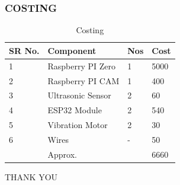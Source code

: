 \documentclass[
	11pt, %
	aspectratio=169, %
]{beamer}
\begin{document}
\begin{frame}
	\frametitle{COSTING}
	\begin{table}
		\large
		\begin{tabular}{l l l l}
			\toprule
			\textbf{SR No.} & \textbf{Component} & \textbf{Nos} & \textbf{Cost}\\
			\midrule
			1 & Raspberry PI Zero & 1 & 5000 \\
			2 & Raspberry PI CAM & 1 & 400 \\
			3 & Ultrasonic Sensor & 2 & 60 \\
			4 & ESP32 Module & 2 & 540 \\
			5 & Vibration Motor & 2 & 30 \\
			6 & Wires & - & 50 \\
			 & Approx. & & 6660 \\
			\bottomrule
		\end{tabular}
		\caption{Costing}
	\end{table}
\end{frame}


\begin{frame}[plain] %
	\begin{center}
		{\Huge THANK YOU}
	\end{center}
\end{frame}

\end{document}
